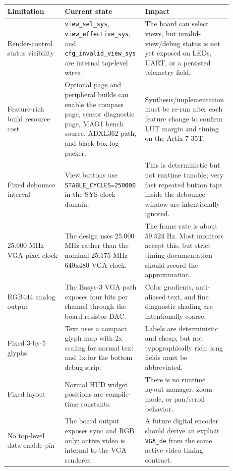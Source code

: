 \documentclass{article}
\newcommand{\sig}[1]{\begingroup\nolinkurl{#1}\endgroup}
\begin{document}
\begin{longtable}{p{0.25\linewidth} p{0.35\linewidth} p{0.30\linewidth}}
\toprule
\textbf{Limitation} & \textbf{Current state} & \textbf{Impact} \\
\midrule
\endhead
Render-control status visibility &
\sig{view_sel_sys}, \sig{view_effective_sys}, and \sig{cfg_invalid_view_sys}
are internal top-level wires. &
The board can select views, but invalid-view/debug status is not yet exposed on
LEDs, UART, or a persisted telemetry field. \\

Feature-rich build resource cost &
Optional page and peripheral builds can enable the compass page, sensor
diagnostic page, MAG1 bench source, ADXL362 path, and black-box log packer. &
Synthesis/implementation must be re-run after each feature change to confirm LUT
margin and timing on the Artix-7 35T. \\

Fixed debounce interval &
View buttons use \sig{STABLE_CYCLES=250000} in the SYS clock domain. &
This is deterministic but not runtime tunable; very fast repeated button taps
inside the debounce window are intentionally ignored. \\

25.000 MHz VGA pixel clock &
The design uses 25.000 MHz rather than the nominal 25.175 MHz 640x480 VGA
clock. &
The frame rate is about 59.524 Hz.  Most monitors accept this, but strict
timing documentation should record the approximation. \\

RGB444 analog output &
The Basys-3 VGA path exposes four bits per channel through the board resistor
DAC. &
Color gradients, anti-aliased text, and fine diagnostic shading are intentionally
coarse. \\

Fixed 3-by-5 glyphs &
Text uses a compact glyph map with 2x scaling for normal text and 1x for the
bottom debug strip. &
Labels are deterministic and cheap, but not typographically rich; long fields
must be abbreviated. \\

Fixed layout &
Normal HUD widget positions are compile-time constants. &
There is no runtime layout manager, zoom mode, or pan/scroll behavior. \\

No top-level data-enable pin &
The board output exposes sync and RGB only; active video is internal to the VGA
renderer. &
A future digital encoder should derive an explicit \sig{VGA_de} from the same
active-video timing contract. \\
\bottomrule
\end{longtable}
\end{document}

